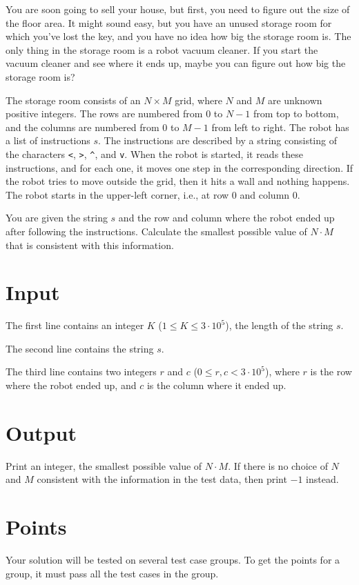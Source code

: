 \noindent
You are soon going to sell your house, but first, you need to figure out the size of the floor area. It might sound easy,
but you have an unused storage room for which you've lost the key, and you have no idea how big the storage room is.
The only thing in the storage room is a robot vacuum cleaner. If you start the vacuum cleaner and see where
it ends up, maybe you can figure out how big the storage room is?

The storage room consists of an $N \times M$ grid, where $N$ and $M$ are unknown positive integers. The rows are
numbered from $0$ to $N-1$ from top to bottom, and the columns are numbered from $0$ to $M-1$ from left to right.
The robot has a list of instructions $s$. The instructions are described by a string consisting of the characters \verb|<|, \verb|>|, \verb|^|, and \verb|v|.
When the robot is started, it reads these instructions, and for each one, it moves one step in the corresponding direction.
If the robot tries to move outside the grid, then it hits a wall and nothing happens.
The robot starts in the upper-left corner, i.e., at row $0$ and column $0$.

You are given the string $s$ and the row and column where the robot ended up after following the instructions.
Calculate the smallest possible value of $N \cdot M$ that is consistent with this information.

\section*{Input}
The first line contains an integer $K$ ($1 \leq K \leq 3 \cdot 10^5$), the length of the string $s$.

The second line contains the string $s$.

The third line contains two integers $r$ and $c$ ($0 \leq r,c < 3 \cdot 10^5$), where
$r$ is the row where the robot ended up, and $c$ is the column where it ended up.

\section*{Output}
Print an integer, the smallest possible value of $N \cdot M$. If there is no choice of $N$ and $M$ consistent
with the information in the test data, then print $-1$ instead.

\section*{Points}
Your solution will be tested on several test case groups.
To get the points for a group, it must pass all the test cases in the group.

